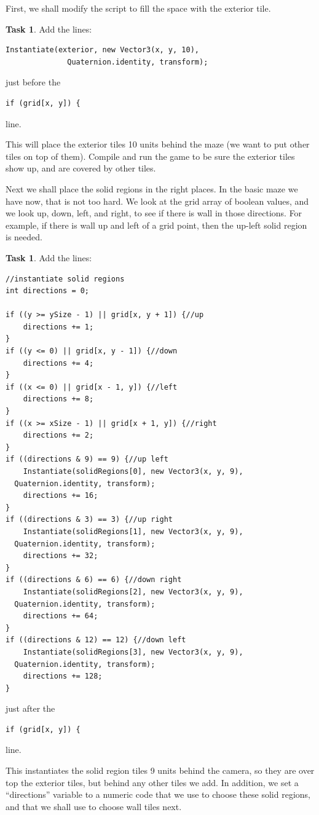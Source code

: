 \documentclass[12pt]{amsbook}
\theoremstyle{definition}
\newtheorem{task}[exercise]{Task}
\theoremstyle{remark}
\numberwithin{figure}{chapter}
\numberwithin{table}{chapter}
\numberwithin{section}{chapter}
\numberwithin{equation}{section}
\begin{document}
First, we shall modify the script to fill the space with the exterior tile.

\begin{task}
Add the lines:
\begin{verbatim}
Instantiate(exterior, new Vector3(x, y, 10),
              Quaternion.identity, transform);
\end{verbatim}
just before the
\begin{verbatim}
if (grid[x, y]) {
\end{verbatim}
line.
\end{task}

This will place the exterior tiles 10 units behind the maze (we want to put other tiles on top of them).  Compile and run the game to be sure the exterior tiles show up, and are covered by other tiles.

Next we shall place the solid regions in the right places.  In the basic maze we have now, that is not too hard.  We look at the grid array of boolean values, and we look up, down, left, and right, to see if there is wall in those directions.  For example, if there is wall up and left of a grid point, then the up-left solid region is needed. 


\begin{task}
Add the lines:
\begin{verbatim}
//instantiate solid regions
int directions = 0;

if ((y >= ySize - 1) || grid[x, y + 1]) {//up
    directions += 1;
}
if ((y <= 0) || grid[x, y - 1]) {//down
    directions += 4;
}
if ((x <= 0) || grid[x - 1, y]) {//left
    directions += 8;
}
if ((x >= xSize - 1) || grid[x + 1, y]) {//right
    directions += 2;
}
if ((directions & 9) == 9) {//up left
    Instantiate(solidRegions[0], new Vector3(x, y, 9),
  Quaternion.identity, transform);
    directions += 16;
}
if ((directions & 3) == 3) {//up right
    Instantiate(solidRegions[1], new Vector3(x, y, 9),
  Quaternion.identity, transform);
    directions += 32;
}
if ((directions & 6) == 6) {//down right
    Instantiate(solidRegions[2], new Vector3(x, y, 9),
  Quaternion.identity, transform);
    directions += 64;
}
if ((directions & 12) == 12) {//down left
    Instantiate(solidRegions[3], new Vector3(x, y, 9),
  Quaternion.identity, transform);
    directions += 128;
}
\end{verbatim}
just after the
\begin{verbatim}
if (grid[x, y]) {
\end{verbatim}
line.
\end{task}
This instantiates the solid region tiles 9 units behind the camera, so they are over top the exterior tiles, but behind any other tiles we add.  In addition, we set a ``directions'' variable to a numeric code that we use to choose these solid regions, and that we shall use to choose wall tiles next.
\end{document}
